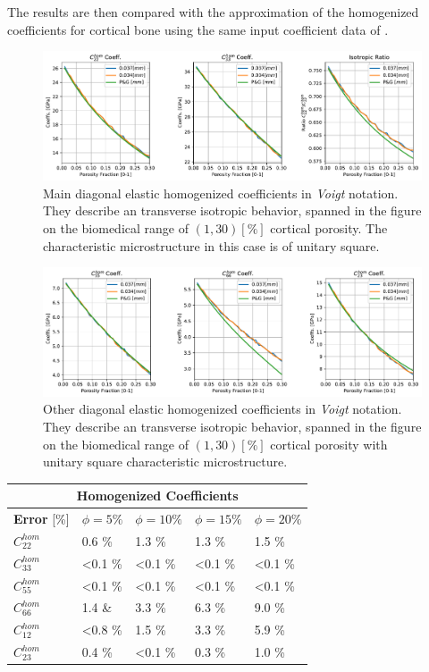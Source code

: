 The results are then compared with the approximation of the homogenized coefficients for cortical bone using the same input coefficient data of \cite{Parnell2008}.

\begin{figure}[!h]
	\centering
	\includegraphics[scale=.5]{images/CellsProb/CellProb_MainHomCoeffsCircular.pdf}
	\caption{Main diagonal elastic homogenized coefficients in \textit{Voigt} notation. They describe an transverse isotropic behavior, spanned in the figure on the biomedical range of $(1,30) [\%]$ cortical porosity. The characteristic microstructure in this case is of unitary square.}
	\label{MainHomCoeffsSquare}
\end{figure}

\begin{figure}[!h]
	\centering
	\includegraphics[scale=.5]{images/CellsProb/CellProb_OthersHomCoeffsCircular.pdf}
	\caption{Other diagonal elastic homogenized coefficients in \textit{Voigt} notation. They describe an transverse isotropic behavior, spanned in the figure on the biomedical range of $(1,30) [\%]$ cortical porosity with unitary square characteristic microstructure.}
	\label{OtherHomCoeffsSquare}
\end{figure}

\begin{center}
\begin{tabular}{ |p{2.2cm}||p{2cm}|p{2cm}|p{2cm}|p{2cm}| }
 \hline
 \multicolumn{5}{|c|}{\textbf{Homogenized Coefficients}} \\
 \hline
 \textbf{Error} [\%] & $\phi = 5 \%$ & $\phi = 10 \%$ & $\phi = 15 \%$ & $\phi = 20 \%$ \\
 \hline
 $C^{hom}_{22}$ & 0.6 \% & 1.3 \% & 1.3 \% & 1.5 \% \\
 $C^{hom}_{33}$ & <0.1 \% & <0.1 \% & <0.1 \% & <0.1 \% \\
 $C^{hom}_{55}$ & <0.1 \% & <0.1 \% & <0.1 \% & <0.1 \% \\
 $C^{hom}_{66}$ & 1.4 \& & 3.3 \% & 6.3 \% & 9.0 \% \\
 $C^{hom}_{12}$ & <0.8 \% & 1.5 \% & 3.3 \% & 5.9 \% \\
 $C^{hom}_{23}$ & 0.4 \% & <0.1 \% & 0.3 \% & 1.0 \% \\
 \hline
\end{tabular}
\end{center}



